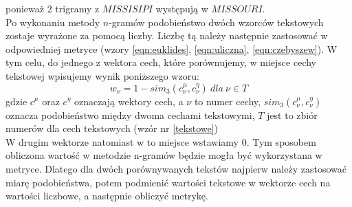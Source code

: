 \documentclass{classrep}
\begin{document}
\noindent ponieważ 2 trigramy z $MISSISIPI$ występują w $MISSOURI$.\\

Po wykonaniu metody $n$-gramów podobieństwo dwóch wzorców tekstowych zostaje wyrażone za pomocą liczby. Liczbę tą należy następnie zastosować w odpowiedniej metryce (wzory \ref{eqn:euklides}, \ref{eqn:uliczna}, \ref{eqn:czebyszew}). W tym celu, do jednego z wektora cech, które porównujemy, w miejsce cechy tekstowej wpisujemy wynik poniższego wzoru:
\begin{equation}
\label{tesktowa_na_numeryczna}
    w_{\nu} = 1 - sim_3(c_{\nu}^\mu, c_{\nu}^\eta) \: dla \: \nu \in T
\end{equation}
gdzie $c^\mu$ oraz $c^\eta$ oznaczają wektory cech, a $\nu$ to numer cechy, $sim_3(c_{\nu}^\mu, c_{\nu}^\eta)$ oznacza podobieństwo między dwoma cechami tekstowymi, $T$ jest to zbiór numerów dla cech tekstowych (wzór nr \ref{tekstowe})\\
W drugim wektorze natomiast w to miejsce wstawiamy 0. Tym sposobem obliczona wartość w metodzie n-gramów będzie mogła być wykorzystana w metryce. Dlatego dla dwóch porównywanych tekstów najpierw należy zastosować miarę podobieństwa, potem podmienić wartości tekstowe w wektorze cech na wartości liczbowe, a następnie obliczyć metrykę.\\
\end{document}
